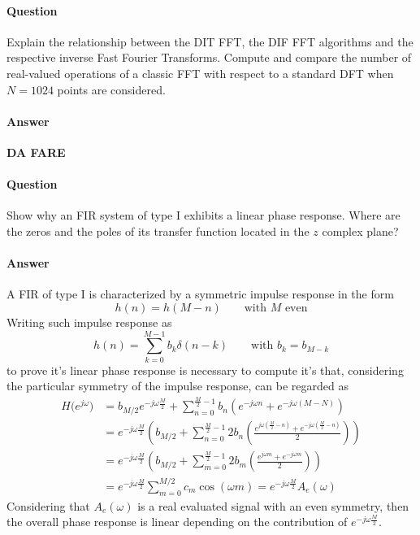 \newquestion
	\paragraph{Question} Explain the relationship between the DIT FFT, the DIF FFT algorithms and the respective inverse Fast Fourier Transforms. Compute and compare the number of real-valued operations of a classic FFT with respect to a standard DFT when $N = 1024$ points are considered.
	
	\paragraph{Answer}	\textbf{DA FARE}
	
\newquestion
	\paragraph{Question} Show why an FIR system of type I exhibits a linear phase response. Where are the zeros and the poles	of its transfer function located in the $z$ complex plane?
	
	\paragraph{Answer} A FIR of type I is characterized by a symmetric impulse response in the form
	\[ h(n) = h(M-n) \qquad \textrm{with $M$ even} \]
	Writing such impulse response as
	\[ h(n) = \sum_{k=0}^{M-1} b_k \delta(n-k) 	\qquad \textrm{with } b_k = b_{M-k} \]
	to prove it's linear phase response is necessary to compute it's \dtft that, considering the particular symmetry of the impulse response, can be regarded as
	\begin{align*}
		H\big(e^{j\omega}\big) & = b_{M/2} e^{-j\omega \frac M2} + \sum_{n=0}^{\frac M2-1} b_n \left( e^{-j\omega n} + e^{-j\omega(M-N)} \right) \\
		& = e^{-j\omega \frac M 2} \left( b_{M/2} + \sum_{n=0}^{\frac M2-1} 2 b_n \left( \frac{e^{j\omega\left( \frac M 2 - n \right)} +e^{-j\omega\left( \frac M 2 - n \right)} }{2} \right) \right) \\
		& = e^{-j\omega \frac M 2} \left( b_{M/2} + \sum_{m=0}^{\frac M2-1} 2 b_m \left( \frac{e^{j\omega m } +e^{-j\omega m} }{2} \right) \right) \\
		& = e^{-j\omega \frac M 2} \sum_{m=0}^{M/2} c_m \cos(\omega m) = e^{-j\omega \frac M2} A_e(\omega)
	\end{align*}
	Considering that $A_e(\omega)$ is a real evaluated signal with an even symmetry, then the overall phase response is linear depending on the contribution of $e^{-j\omega \frac M2}$.
	
